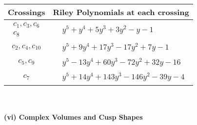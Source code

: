 \documentclass[1p]{elsarticle_modified}
\theoremstyle{definition}
\begin{document}
\begin{tabular}{m{50pt}|m{274pt}}
Crossings & \hspace{64pt}Riley Polynomials at each crossing \\
\hline $$\begin{aligned}c_{1},c_{3},c_{6}\\c_{8}\end{aligned}$$&$\begin{aligned}
&y^5+y^4+5 y^3+3 y^2- y-1
\end{aligned}$\\
\hline $$\begin{aligned}c_{2},c_{4},c_{10}\end{aligned}$$&$\begin{aligned}
&y^5+9 y^4+17 y^3-17 y^2+7 y-1
\end{aligned}$\\
\hline $$\begin{aligned}c_{5},c_{9}\end{aligned}$$&$\begin{aligned}
&y^5-13 y^4+60 y^3-72 y^2+32 y-16
\end{aligned}$\\
\hline $$\begin{aligned}c_{7}\end{aligned}$$&$\begin{aligned}
&y^5+14 y^4+143 y^3-146 y^2-39 y-4
\end{aligned}$\\
\hline
\end{tabular}\\~\\
\newpage\flushleft \textbf{(vi) Complex Volumes and Cusp Shapes}
\end{document}
